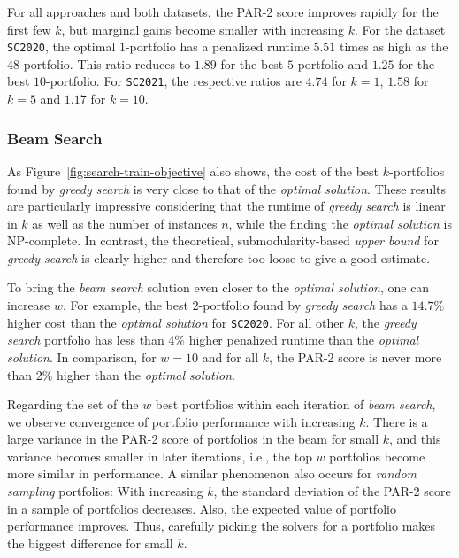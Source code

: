 \documentclass[conference]{IEEEtran}
\begin{document}
For all approaches and both datasets, the PAR-2 score improves rapidly for the first few $k$, but marginal gains become smaller with increasing $k$.
For the dataset \texttt{SC2020}, the optimal $1$-portfolio has a penalized runtime $5.51$ times as high as the $48$-portfolio.
This ratio reduces to $1.89$ for the best $5$-portfolio and $1.25$ for the best $10$-portfolio.
For \texttt{SC2021}, the respective ratios are $4.74$ for $k=1$, $1.58$ for $k=5$ and $1.17$ for $k=10$.

\subsubsection{Beam Search}

As Figure~\ref{fig:search-train-objective} also shows, the cost of the best $k$-portfolios found by \emph{greedy search} is very close to that of the \emph{optimal solution}.
These results are particularly impressive considering that the runtime of \emph{greedy search} is linear in $k$ as well as the number of instances $n$, while the finding the \emph{optimal solution} is NP-complete.
In contrast, the theoretical, submodularity-based \emph{upper bound} for \emph{greedy search} is clearly higher and therefore too loose to give a good estimate.

To bring the \emph{beam search} solution even closer to the \emph{optimal solution}, one can increase $w$.
For example, the best $2$-portfolio found by \emph{greedy search} has a $14.7\%$ higher cost than the \emph{optimal solution} for \texttt{SC2020}.
For all other $k$, the \emph{greedy search} portfolio has less than $4\%$ higher penalized runtime than the \emph{optimal solution}.
In comparison, for $w=10$ and for all $k$, the PAR-2 score is never more than $2\%$ higher than the \emph{optimal solution}.

Regarding the set of the $w$ best portfolios within each iteration of \emph{beam search}, we observe convergence of portfolio performance with increasing $k$. 
There is a large variance in the PAR-2 score of portfolios in the beam for small $k$, and this variance becomes smaller in later iterations, i.e., the top $w$ portfolios become more similar in performance.
A similar phenomenon also occurs for \emph{random sampling} portfolios:
With increasing $k$, the standard deviation of the PAR-2 score in a sample of portfolios decreases.
Also, the expected value of portfolio performance improves.
Thus, carefully picking the solvers for a portfolio makes the biggest difference for small $k$.
\end{document}
